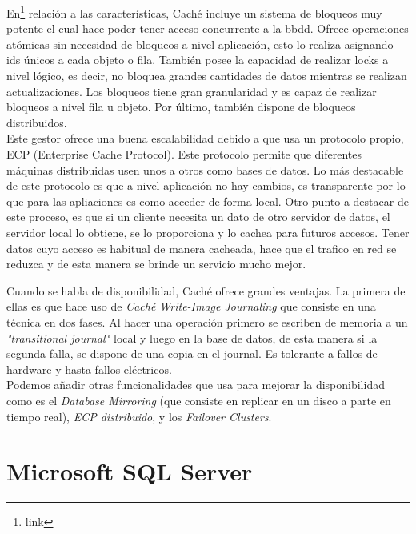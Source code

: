 \documentclass{article}
\begin{document}
En\footnote{link} relación a las características, Caché incluye un sistema de bloqueos muy potente el cual hace poder tener acceso concurrente a la bbdd. Ofrece operaciones atómicas sin necesidad de bloqueos a nivel aplicación, esto lo realiza asignando ids únicos a cada objeto o fila. También posee la capacidad de realizar locks a nivel lógico, es decir, no bloquea grandes cantidades de datos mientras se realizan actualizaciones. Los bloqueos tiene gran granularidad y es capaz de realizar bloqueos a nivel fila u objeto. Por último, también dispone de bloqueos distribuidos.\\

Este gestor ofrece una buena escalabilidad debido a que usa un protocolo propio, ECP (Enterprise Cache Protocol). Este protocolo permite que diferentes máquinas distribuidas usen unos a otros como bases de datos. Lo más destacable de este protocolo es que a nivel aplicación no hay cambios, es transparente por lo que para las apliaciones es como acceder de forma local. Otro punto a destacar de este proceso, es que si un cliente necesita un dato de otro servidor de datos, el servidor local lo obtiene, se lo proporciona y lo cachea para futuros accesos. Tener datos cuyo acceso es habitual de manera cacheada, hace que el trafico en red se reduzca y de esta manera se brinde un servicio mucho mejor.

Cuando  se habla de disponibilidad, Caché ofrece grandes ventajas. La primera de ellas es que hace uso de \textit{Caché Write-Image Journaling} que consiste en una técnica en dos fases. Al hacer una operación primero se escriben de memoria a un \textit{"transitional journal"} local  y luego en la base de datos, de esta manera si la segunda falla, se dispone de una copia en el journal. Es tolerante a fallos de hardware y hasta fallos eléctricos. \\
Podemos añadir otras funcionalidades que usa para mejorar la disponibilidad como es el \textit{Database Mirroring} (que consiste en replicar en un disco a parte en tiempo real), \textit{ECP distribuido}, y los \textit{Failover Clusters}.


\section{Microsoft SQL Server}
\end{document}

